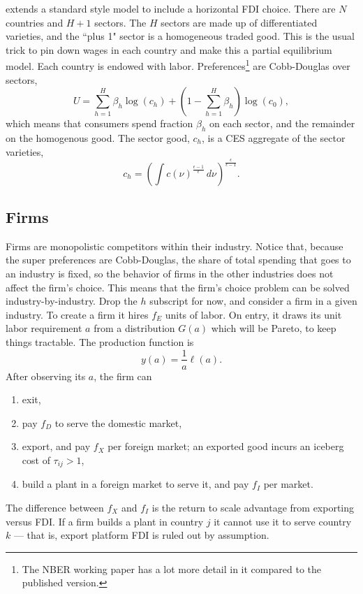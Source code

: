 \documentclass[11pt, pdftex]{article}
\begin{document}
\citet{HMY04} extends a standard \citet{melitz} style model to include a horizontal FDI choice.  There are $N$ countries and $H+1$ sectors.  The $H$ sectors are made up of differentiated varieties, and the ``plus 1" sector is a homogeneous traded good.  This is the usual trick to pin down wages in each country and make this a partial equilibrium  model.  Each country is endowed with labor.  Preferences\footnote{The NBER working paper has a lot more detail in it compared to the published version.} are Cobb-Douglas over sectors,
\begin{equation}\label{eq:pref}
    U= \sum_{h=1}^H \beta_h \log(c_h) + \left(1-\sum_{h=1}^H\beta_h \right)\log (c_0),
\end{equation}
which means that consumers spend fraction $\beta_h$ on each sector, and the remainder on the homogenous good. The sector good, $c_h$, is a CES aggregate of the sector varieties,
\begin{equation}\label{eq:ces}
    c_h=\left( \int c(\nu)^{\frac{\epsilon-1}{\epsilon}} \, d\nu \right)^{\frac{\epsilon}{\epsilon-1}}.
\end{equation}

\subsection*{Firms}
Firms are monopolistic competitors within their industry. Notice that, because the super preferences are Cobb-Douglas, the share of total spending that goes to an industry is fixed, so the behavior of firms in the other industries does not affect the firm's choice.  This means that the firm's choice problem can be solved industry-by-industry.  Drop the $h$ subscript for now, and consider a firm in a given industry. To create a firm it hires $f_E$ units of labor. On entry, it draws its unit labor requirement $a$ from a distribution $G(a)$ which will be Pareto, to keep things tractable.  The production function is
\begin{equation}\label{eq:prod}
    y(a)=\frac{1}{a}\ell(a).
\end{equation}
After observing its $a$, the firm can
 \begin{enumerate}
   \item exit,
   \item pay $f_D$ to serve the domestic market,
   \item export, and pay $f_X$ per foreign market; an exported good incurs an iceberg cost of $\tau_{ij}>1$,
   \item build a plant in a foreign market to serve it, and pay $f_I$ per market.
 \end{enumerate}
The difference between $f_X$ and $f_I$ is the return to scale advantage from exporting versus FDI.  If a firm builds a plant in country $j$ it cannot use it to serve country $k$ --- that is, export platform FDI is ruled out by assumption.
\end{document}
